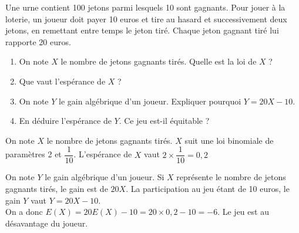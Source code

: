 \documentclass[11pt,fleqn, openany]{book} %
\begin{document}
\begin{exercise}[topic=lgn02]
Une urne contient 100 jetons parmi lesquels 10 sont gagnants. Pour jouer à la loterie, un joueur doit payer 10 euros et tire au hasard et successivement deux jetons, en remettant entre temps le jeton tiré. Chaque jeton gagnant tiré lui rapporte 20 euros.

\begin{enumerate}
\item On note $X$ le nombre de jetons gagnants tirés. Quelle est la loi de $X$ ?
\item Que vaut l'espérance de $X$ ?
\item On note $Y$ le gain algébrique d'un joueur. Expliquer pourquoi $Y=20X-10$.
\item En déduire l'espérance de $Y$. Ce jeu est-il équitable ?
\end{enumerate}\newpage \end{exercise}

\begin{solution}On note $X$ le nombre de jetons gagnants tirés. $X$ suit une loi binomiale de paramètres 2 et $\dfrac{1}{10}$. L'espérance de $X$ vaut $2 \times \dfrac{1}{10}=0,2$

On note $Y$ le gain algébrique d'un joueur. Si $X$ représente le nombre de jetons gagnants tirés, le gain est de $20 X$. La participation au jeu étant de 10 euros, le gain $Y$ vaut $Y=20X-10$. \\On a donc $E(X)=20 E(X)-10=20 \times 0,2 -10 = -6$. Le jeu est au désavantage du joueur.\end{solution}
\end{document}
